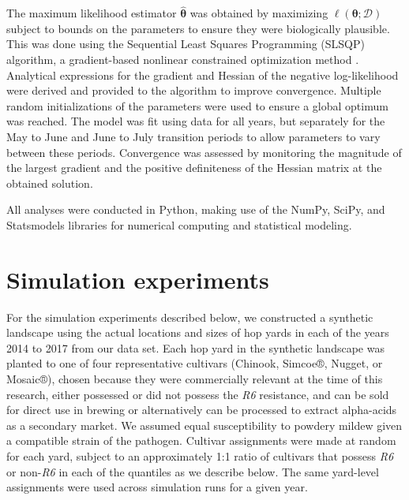 \documentclass[10pt,a4paper]{article}
\begin{document}
The maximum likelihood estimator $\hat{\boldsymbol{\theta}}$ was obtained by maximizing $\ell(\boldsymbol{\theta}; \mathcal{D})$ subject to bounds on the parameters to ensure they were biologically plausible. This was done using the Sequential Least Squares Programming (SLSQP) algorithm, a gradient-based nonlinear constrained optimization method  \parencite{Kraft1988}. Analytical expressions for the gradient and Hessian of the negative log-likelihood were derived and provided to the algorithm to improve convergence. Multiple random initializations of the parameters were used to ensure a global optimum was reached. The model was fit using data for all years, but separately for the May to June and June to July transition periods to allow parameters to vary between these periods. Convergence was assessed by monitoring the magnitude of the largest gradient and the positive definiteness of the Hessian matrix at the obtained solution.

All analyses were conducted in Python, making use of the NumPy, SciPy, and Statsmodels libraries for numerical computing and statistical modeling.

\section{Simulation experiments}

For the simulation experiments described below, we constructed a synthetic landscape using the actual locations and sizes of hop yards in each of the years 2014 to 2017 from our data set. Each hop yard in the synthetic landscape was planted to one of four representative cultivars (Chinook, Simcoe®, Nugget, or Mosaic®), chosen because they were commercially relevant at the time of this research, either possessed or did not possess the \textit{R6} resistance, and can be sold for direct use in brewing or alternatively can be processed to extract alpha-acids as a secondary market. We assumed equal susceptibility to powdery mildew given a compatible strain of the pathogen. Cultivar assignments were made at random for each yard, subject to an approximately 1:1 ratio of cultivars that possess \textit{R6 }or non-\textit{R6} in each of the quantiles as we describe below. The same yard-level assignments were used across simulation runs for a given year.
\end{document}
